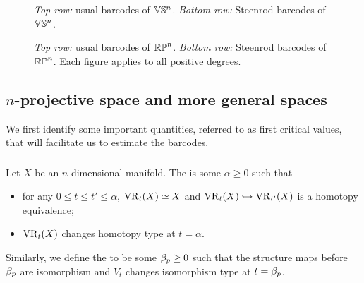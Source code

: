 
\begin{figure}
	\centering
	
	\caption{\emph{Top row:} usual barcodes of $\mathbb{V}\mathbb{S}^n$. \emph{Bottom row:} Steenrod barcodes of $\mathbb{V}\mathbb{S}^n$. }
	\label{fig:barcodes}
\end{figure}

\begin{figure}
	\centering
	
	\caption{\emph{Top row:} usual barcodes of $\mathbb{RP}^n$. \emph{Bottom row:} Steenrod barcodes of $\mathbb{RP}^n$. Each figure applies to all positive degrees. }
	\label{fig:sq barcodes}
\end{figure}

\subsection{$n$-projective space and more general spaces}

We first identify some important quantities, referred to as first critical values, that will facilitate us to estimate the barcodes.

\subsubsection{}
\label{subsub:first_critical_value}

Let $X$ be an $n$-dimensional manifold.
The  is some $\alpha\geq 0$ such that 
\begin{itemize}
    \item for any $0 \leq t\leq t'\leq \alpha$, $\operatorname{VR}_t(X)\simeq X$ and $\operatorname{VR}_{t}(X) \hookrightarrow \operatorname{VR}_{t'}(X)$ is a homotopy equivalence;
    \item $\operatorname{VR}_t(X)$ changes homotopy type at $t=\alpha$.
\end{itemize}
Similarly, we define the  to be some $\beta_p \geq 0$ such that the structure maps before $\beta_p $ are isomorphism and $V_t$ changes isomorphism type at $t = \beta_p $.

